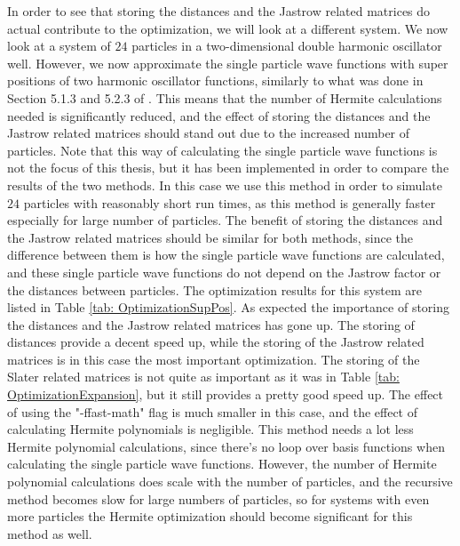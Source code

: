 \documentclass[../main.tex]{subfiles}
\begin{document}
In order to see that storing the distances and the Jastrow related matrices do actual contribute to the optimization, we will look at a different system. We now look at a system of $24$ particles in a two-dimensional double harmonic oscillator well. However, we now approximate the single particle wave functions with super positions of two harmonic oscillator functions, similarly to what was done in Section 5.1.3 and 5.2.3 of \cite{Jorgen}. This means that the number of Hermite calculations needed is significantly reduced, and the effect of storing the distances and the Jastrow related matrices should stand out due to the increased number of particles. Note that this way of calculating the single particle wave functions is not the focus of this thesis, but it has been implemented in order to compare the results of the two methods. In this case we use this method in order to simulate $24$ particles with reasonably short run times, as this method is generally faster especially for large number of particles. The benefit of storing the distances and the Jastrow related matrices should be similar for both methods, since the difference between them is how the single particle wave functions are calculated, and these single particle wave functions do not depend on the Jastrow factor or the distances between particles. The optimization results for this system are listed in Table \ref{tab: OptimizationSupPos}. As expected the importance of storing the distances and the Jastrow related matrices has gone up. The storing of distances provide a decent speed up, while the storing of the Jastrow related matrices is in this case the most important optimization. The storing of the Slater related matrices is not quite as important as it was in Table \ref{tab: OptimizationExpansion}, but it still provides a pretty good speed up. The effect of using the "-ffast-math" flag is much smaller in this case, and the effect of calculating Hermite polynomials is negligible. This method needs a lot less Hermite polynomial calculations, since there's no loop over basis functions when calculating the single particle wave functions. However, the number of Hermite polynomial calculations does scale with the number of particles, and the recursive method becomes slow for large numbers of particles, so for systems with even more particles the Hermite optimization should become significant for this method as well.
\end{document}
